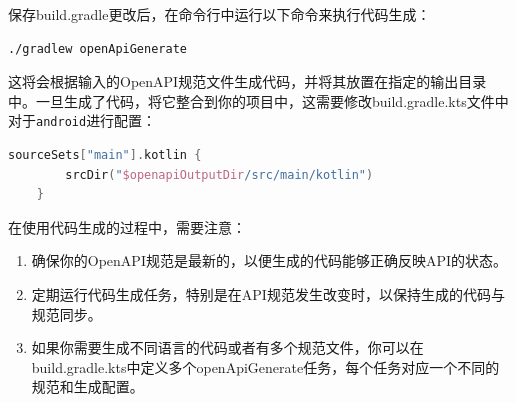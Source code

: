 \documentclass[main.tex]{subfiles}
\begin{document}
保存build.gradle更改后，在命令行中运行以下命令来执行代码生成：

\begin{lstlisting}
./gradlew openApiGenerate
\end{lstlisting}

这将会根据输入的OpenAPI规范文件生成代码，并将其放置在指定的输出目录中。一旦生成了代码，将它整合到你的项目中，这需要修改build.gradle.kts文件中对于\texttt{android}进行配置：

\begin{lstlisting}[language=Kotlin]
    sourceSets["main"].kotlin {
        srcDir("$openapiOutputDir/src/main/kotlin")
    }
\end{lstlisting}

在使用代码生成的过程中，需要注意：

\begin{enumerate}
    \item 确保你的OpenAPI规范是最新的，以便生成的代码能够正确反映API的状态。
    \item 定期运行代码生成任务，特别是在API规范发生改变时，以保持生成的代码与规范同步。
    \item 如果你需要生成不同语言的代码或者有多个规范文件，你可以在build.gradle.kts中定义多个openApiGenerate任务，每个任务对应一个不同的规范和生成配置。
\end{enumerate}
\end{document}

